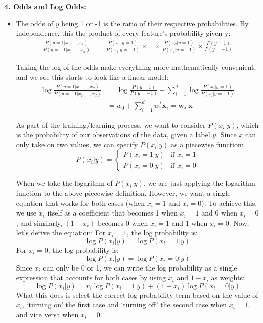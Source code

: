 \textbf{4. Odds and Log Odds:}
\begin{itemize}
    \item The odds of $y$ being 1 or -1 is the ratio of their respective probabilities. By independence, this the product of every feature's probability given y:
    \begin{align*}\frac{P(y=1|x_1,\ldots,x_d)}{P(y=-1|x_1,\ldots,x_d)}&=\frac{P(x_1|y=1)}{P(x_1|y=-1)}\times\ldots\times\frac{P(x_d|y=1)}{P(x_d|y=-1)}\times\frac{P(y=1)}{P(y=-1)}\end{align*}

    Taking the log of the odds make everything more mathematically convenient, and we see this starts to look like a linear model:
    \begin{align*}
    \log\frac{P(y=1|x_1,\ldots,x_d)}{P(y=-1|x_1,\ldots,x_d)}&=\log\frac{P(y=1)}{P(y=-1)}+\sum_{i=1}^{d}\log\frac{P(x_i|y=1)}{P(x_i|y=-1)}\\
&=w_0+ \sum_{i=1}^dw_i^*\mathbf{x}_i=\mathbf{w}_*^\top\mathbf{x}
    \end{align*}

As part of the training/learning process, we want to consider $P(x_i|y)$, which is the probability of our observations of the data, given a label $y$.
Since $x$ can only take on two values, we can specify $P(x_i|y)$ as a piecewise function:
\[
P(x_i|y)=
\begin{cases}
    P(x_i = 1 | y) & \text{if } x_i = 1 \\
P(x_i = 0 | y) & \text{if } x_i = 0
\end{cases} \]

When we take the logarithm of \( P(x_i | y) \), we are just applying the logarithm function to the above piecewise definition. However, we want a single equation that works for both cases (when \( x_i = 1 \) and \( x_i = 0 \)). To achieve this, we use \( x_i \) itself as a coefficient that becomes 1 when \( x_i = 1 \) and 0 when \( x_i = 0 \), and similarly, \( (1 - x_i) \) becomes 0 when \( x_i = 1 \) and 1 when \( x_i = 0 \).
Now, let's derive the equation:
For \( x_i = 1 \), the log probability is:
\[ \log P(x_i | y) = \log P(x_i = 1 | y) \]
For \( x_i = 0 \), the log probability is:
\[ \log P(x_i | y) = \log P(x_i = 0 | y) \]
Since \( x_i \) can only be 0 or 1, we can write the log probability as a single expression that accounts for both cases by using \( x_i \) and \( 1 - x_i \) as weights:
\[ \log P(x_i | y) = x_i \log P(x_i = 1 | y) + (1 - x_i) \log P(x_i = 0 | y) \]
What this does is select the correct log probability term based on the value of \( x_i \), `turning on' the first case and `turning off' the second case when $x_i = 1$, and vice versa when $x_i = 0$.


\end{itemize}
